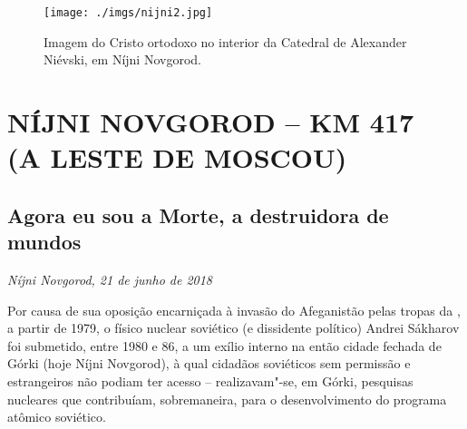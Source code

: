 
\movetoevenpage
\begin{absolutelynopagebreak}
\begin{vplace}
\begin{figure}[H]
\begin{adjustwidth}{-1.8cm}{}
  \vspace{2.7cm}
  \texttt{[image: ./imgs/nijni2.jpg]}  
\end{adjustwidth}
  \caption{Imagem do Cristo ortodoxo no interior da Catedral de Alexander Niévski, em Níjni Novgorod.}

\thispagestyle{empty}

\end{figure}
\end{vplace}

\end{absolutelynopagebreak}

\movetooddpage
{}
\part*{NÍJNI NOVGOROD -- KM 417\\(A LESTE DE MOSCOU)}


\chapter*{Agora eu sou a Morte, a destruidora de mundos}

\begin{flushright}
\emph{Níjni Novgorod, 21 de junho de 2018}
\end{flushright}

Por causa de sua oposição encarniçada à invasão do Afeganistão pelas
tropas da , a partir de 1979, o físico nuclear soviético (e
dissidente político) Andrei Sákharov foi submetido, entre 1980 e 86, a
um exílio interno na então cidade fechada de Górki (hoje Níjni
Novgorod), à qual cidadãos soviéticos sem permissão e estrangeiros não
podiam ter acesso -- realizavam"-se, em Górki, pesquisas nucleares que
contribuíam, sobremaneira, para o desenvolvimento do programa atômico
soviético.

